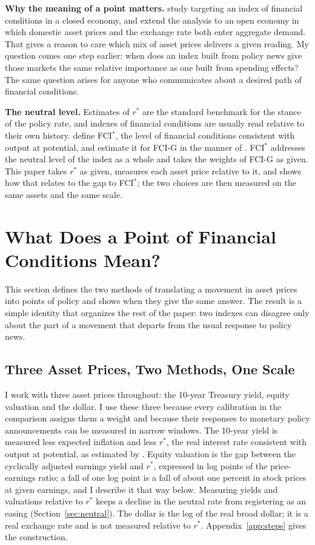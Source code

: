\textbf{Why the meaning of a point matters.} \citet{caballero2024} study targeting an index of financial conditions in a closed economy, and \citet{caballero2026b} extend the analysis to an open economy in which domestic asset prices and the exchange rate both enter aggregate demand. That gives a reason to care which mix of asset prices delivers a given reading. My question comes one step earlier: when does an index built from policy news give those markets the same relative importance as one built from spending effects? The same question arises for anyone who communicates about a desired path of financial conditions.

\textbf{The neutral level.} Estimates of $r^*$ \citep{laubach2003,holston2017,holston2023} are the standard benchmark for the stance of the policy rate, and indexes of financial conditions are usually read relative to their own history. \citet{caballero2026} define FCI$^*$, the level of financial conditions consistent with output at potential, and estimate it for FCI-G in the manner of \citet{laubach2003}. FCI$^*$ addresses the neutral level of the index as a whole and takes the weights of FCI-G as given. This paper takes $r^*$ as given, measures each asset price relative to it, and shows how that relates to the gap to FCI$^*$; the two choices are then measured on the same assets and the same scale.
\FloatBarrier

\section{What Does a Point of Financial Conditions Mean?}\label{sec:indexes}
This section defines the two methods of translating a movement in asset prices into points of policy and shows when they give the same answer. The result is a simple identity that organizes the rest of the paper: two indexes can disagree only about the part of a movement that departs from the usual response to policy news.

\subsection{Three Asset Prices, Two Methods, One Scale}\label{sec:meanings}
I work with three asset prices throughout: the 10-year Treasury yield, equity valuation and the dollar. I use these three because every calibration in the comparison assigns them a weight and because their responses to monetary policy announcements can be measured in narrow windows. The 10-year yield is measured less expected inflation and less $r^*$, the real interest rate consistent with output at potential, as estimated by \citet{laubach2003}. Equity valuation is the gap between the cyclically adjusted earnings yield and $r^*$, expressed in log points of the price-earnings ratio; a fall of one log point is a fall of about one percent in stock prices at given earnings, and I describe it that way below. Measuring yields and valuations relative to $r^*$ keeps a decline in the neutral rate from registering as an easing (Section~\ref{sec:neutral}). The dollar is the log of the real broad dollar; it is a real exchange rate and is not measured relative to $r^*$. Appendix~\ref{app:steps} gives the construction.

